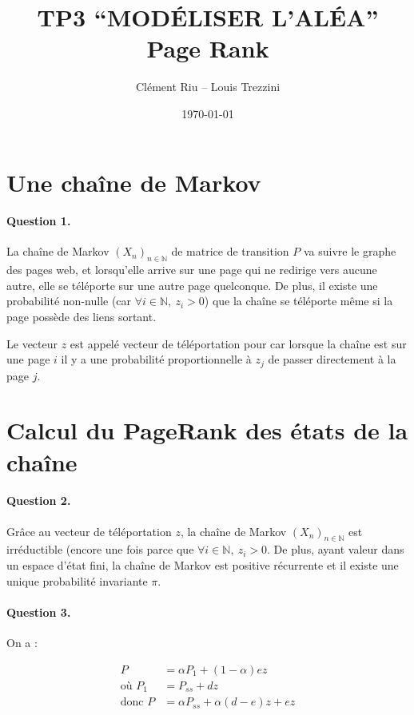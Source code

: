 \documentclass[12pt,a4paper]{article}
\title{\vspace{-3em}\textbf{TP3 “MODÉLISER L’ALÉA” \\ Page Rank}}
\author{Clément Riu -- Louis Trezzini}
\date{\today}
\newcommand{\N}{\mathbb{N}}
\begin{document}
\maketitle

\section{Une chaîne de Markov}

\paragraph*{Question 1.} La chaîne de Markov $(X_n)_{n \in \N}$ de matrice de transition $P$ va suivre le graphe des pages web, et lorsqu'elle arrive sur une page qui ne redirige vers aucune autre, elle se téléporte sur une autre page quelconque. De plus, il existe une probabilité non-nulle (car $\forall i \in \N, \ z_i > 0$) que la chaîne se téléporte même si la page possède des liens sortant.

Le vecteur $z$ est appelé vecteur de téléportation pour car lorsque la chaîne est sur une page $i$ il y a une probabilité proportionnelle à $z_j$ de passer directement à la page $j$.

\section{Calcul du PageRank des états de la chaîne}

\paragraph*{Question 2.} Grâce au vecteur de téléportation $z$, la chaîne de Markov $(X_n)_{n \in \N}$ est irréductible (encore une fois parce que $\forall i \in \N, \ z_i > 0$. De plus, ayant valeur dans un espace d'état fini, la chaîne de Markov est positive récurrente et il existe une unique probabilité invariante $\pi$.

\paragraph*{Question 3.} On a :

\begin{align*}
	P &= \alpha P_1 + (1 - \alpha) e z \\
	\text{o\`u } P_1 &= P_{ss} + dz \\
	\text{donc } P &= \alpha P_{ss} + \alpha (d - e) z + e z
\end{align*}
\end{document}
